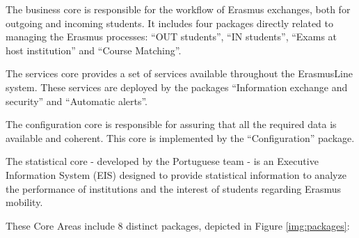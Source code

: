 The business core is responsible for the workflow of Erasmus exchanges, both for
outgoing and incoming students. It includes four packages directly related to
managing the Erasmus processes: “OUT students”, “IN students”, “Exams at host
institution” and “Course Matching”.

The services core provides a set of services available throughout the
ErasmusLine system. These services are deployed by the packages “Information
exchange and security” and “Automatic alerts”.

The configuration core is responsible for assuring that all the required data is
available and coherent. This core is implemented by the “Configuration” package.

The statistical core - developed by the Portuguese team - is an Executive
Information System (EIS) designed to provide statistical information to analyze
the performance of institutions and the interest of students regarding Erasmus
mobility.

These Core Areas include 8 distinct packages, depicted in Figure
\ref{img:packages}:


